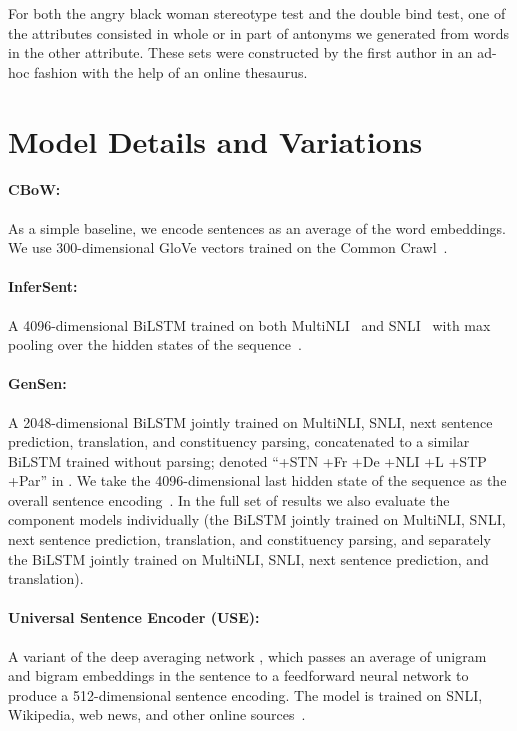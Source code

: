 \documentclass[11pt,a4paper]{article}
\begin{document}
For both the angry black woman stereotype test and the double bind test, one of the attributes consisted in whole or in part of antonyms we generated from words in the other attribute.  These sets were constructed by the first author in an ad-hoc fashion with the help of an online thesaurus.

\section{Model Details and Variations}

\paragraph{CBoW:} As a simple baseline, we encode sentences as an average of the word embeddings. We use 300-dimensional GloVe vectors trained on the Common Crawl~\citep{pennington2014glove}.

\paragraph{InferSent:} A 4096-dimensional BiLSTM trained on both MultiNLI~\citep{Williams2018ABC} and SNLI~\citep{Bowman2015ALA} with max pooling over the hidden states of the sequence~\citep{conneau2017supervised}.

\paragraph{GenSen:} A 2048-dimensional BiLSTM jointly trained on MultiNLI, SNLI, next sentence prediction, translation, and constituency parsing, concatenated to a similar BiLSTM trained without parsing; denoted ``+STN +Fr +De +NLI +L +STP +Par'' in \citet{subramanian2018learning}. We take the 4096-dimensional last hidden state of the sequence as the overall sentence encoding~\citep{subramanian2018learning}.  In the full set of results we also evaluate the component models individually (the BiLSTM jointly trained on MultiNLI, SNLI, next sentence prediction, translation, and constituency parsing, and separately the BiLSTM jointly trained on MultiNLI, SNLI, next sentence prediction, and translation).

\paragraph{Universal Sentence Encoder (USE):} A variant of the deep averaging network \citep{Iyyer2015DeepUC}, which passes an average of unigram and bigram embeddings in the sentence to a feedforward neural network to produce a 512-dimensional sentence encoding. The model is trained on SNLI, Wikipedia, web news, and other online sources~\citep{cer2018universal}.
\end{document}
